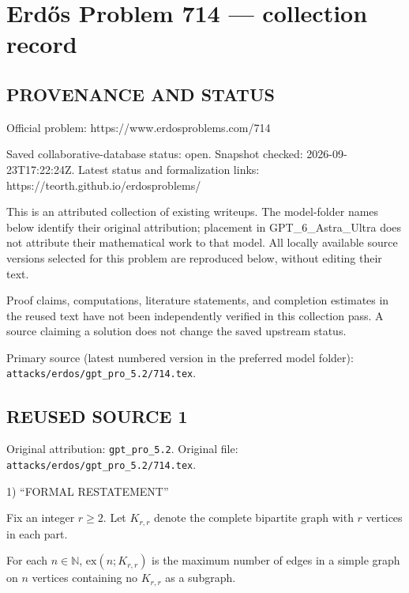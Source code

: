 \section*{Erd\H{o}s Problem 714 --- collection record}

\subsection*{PROVENANCE AND STATUS}
Official problem: https://www.erdosproblems.com/714

Saved collaborative-database status: open.
Snapshot checked: 2026-09-23T17:22:24Z.
Latest status and formalization links: https://teorth.github.io/erdosproblems/

This is an attributed collection of existing writeups. The model-folder names below identify their original attribution; placement in GPT\_6\_Astra\_Ultra does not attribute their mathematical work to that model. All locally available source versions selected for this problem are reproduced below, without editing their text.

Proof claims, computations, literature statements, and completion estimates in the reused text have not been independently verified in this collection pass. A source claiming a solution does not change the saved upstream status.

Primary source (latest numbered version in the preferred model folder): \texttt{attacks/erdos/gpt\_pro\_5.2/714.tex}.

\subsection*{REUSED SOURCE 1}
Original attribution: \texttt{gpt\_pro\_5.2}.
Original file: \texttt{attacks/erdos/gpt\_pro\_5.2/714.tex}.


1) “FORMAL RESTATEMENT”

Fix an integer $r\ge 2$. Let $K_{r,r}$ denote the complete bipartite graph with $r$ vertices in each part.

For each $n\in\mathbb N$, $\mathrm{ex}(n;K_{r,r})$ is the maximum number of edges in a simple graph on $n$ vertices containing no $K_{r,r}$ as a subgraph.


